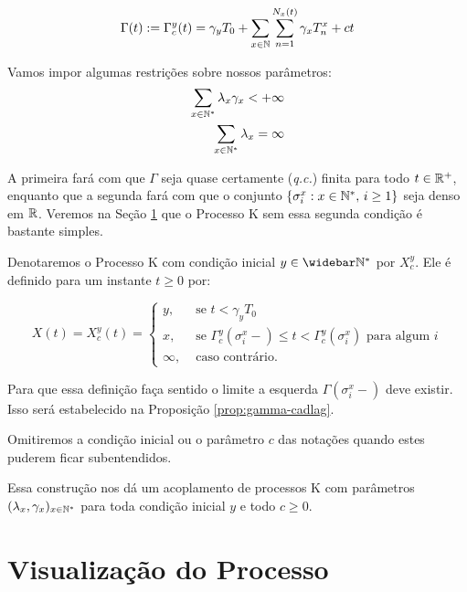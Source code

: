 \begin{equation}
  \label{def:Gamma}
  \Gamma(t) := \Gamma^y_c (t) = \gamma_y T_0
  + \sum_{x \in {\mathbb{N}}} \sum_{n = 1}^{N_x(t)}
  \gamma_x T_n^x
  + ct
\end{equation}

Vamos impor algumas restrições sobre nossos parâmetros:
\begin{align}
  \label{eq:rest-gamma-lambda}
  \sum_{x \in {\mathbb{N^*}}} \lambda_x\gamma_x < +\infty\\
  \label{eq:rest-lambda}
  \sum_{x \in {\mathbb{N^*}}} \lambda_x = \infty
\end{align}

A primeira fará com que $\Gamma$ seja quase certamente (\emph{q.c.}) finita
para todo $t \in {\mathbb{R}}^+$, enquanto que a segunda fará com que o conjunto
$\{\sigma^x_i: x \in {\mathbb{N^*}}, \, i \geq 1\}$ seja denso em ${\mathbb{R}}$. Veremos
na Seção \ref{sec:visualizacao} que o Processo K sem essa segunda
condição é bastante simples.

Denotaremos o Processo K com condição inicial $y \in \Nzb$ por
$X^y_c$. Ele é definido para um instante $t \geq 0$ por:

\begin{equation}
  \label{def:procK}
  X(t) = X^y_c (t) =
  \begin{cases}
    y, & \textrm{ se }  t < \gamma_y T_0\\
    x, & \textrm{ se } \Gamma^y_c(\sigma_i^x-) \leq t <
    \Gamma^y_c(\sigma^x_i)
    \textrm{ para algum } i \\
    \infty, & \textrm{ caso contrário.}
  \end{cases}
\end{equation}

Para que essa definição faça sentido o limite a esquerda $\Gamma
(\sigma_i^x-)$ deve existir. Isso será estabelecido na Proposição
\ref{prop:gamma-cadlag}.

Omitiremos a condição inicial ou o parâmetro $c$ das notações quando
estes puderem ficar subentendidos.

Essa construção nos dá um acoplamento de processos K com parâmetros
$(\lambda_x, \gamma_x)_{x \in {\mathbb{N^*}}}$ para toda condição inicial $y$ e
todo $c \geq 0$.



\section{Visualização do Processo}
\label{sec:visualizacao}

